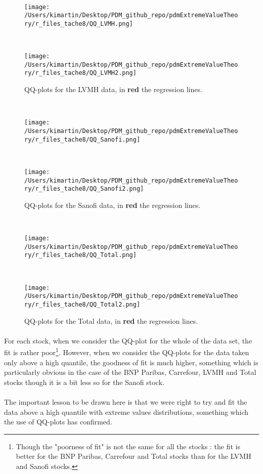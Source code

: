 \\
\begin{figure}[h!]
	\centering
	\begin{minipage}[b]{0.4\textwidth}
		\centering
		\texttt{[image: /Users/kimartin/Desktop/PDM\_github\_repo/pdmExtremeValueTheory/r\_files\_tache8/QQ\_LVMH.png]}
		\label{fig:QQLVMH1}
	\end{minipage}
	~
	\begin{minipage}[b]{0.4\textwidth}
		\centering
		\texttt{[image: /Users/kimartin/Desktop/PDM\_github\_repo/pdmExtremeValueTheory/r\_files\_tache8/QQ\_LVMH2.png]}
		\label{fig:QQLVMH2}
	\end{minipage}
	\caption{QQ-plots for the LVMH data, in \textbf{red} the regression lines.}
\end{figure}
\\
\begin{figure}[h!]
	\centering
	\begin{minipage}[b]{0.4\textwidth}
		\centering
		\texttt{[image: /Users/kimartin/Desktop/PDM\_github\_repo/pdmExtremeValueTheory/r\_files\_tache8/QQ\_Sanofi.png]}
		\label{fig:QQSanofi1}
	\end{minipage}
	~
	\begin{minipage}[b]{0.4\textwidth}
		\centering
		\texttt{[image: /Users/kimartin/Desktop/PDM\_github\_repo/pdmExtremeValueTheory/r\_files\_tache8/QQ\_Sanofi2.png]}
		\label{fig:QQSanofi2}
	\end{minipage}
	\caption{QQ-plots for the Sanofi data, in \textbf{red} the regression lines.}
\end{figure}
\\
\begin{figure}[h!]
	\centering
	\begin{minipage}[b]{0.4\textwidth}
		\centering
		\texttt{[image: /Users/kimartin/Desktop/PDM\_github\_repo/pdmExtremeValueTheory/r\_files\_tache8/QQ\_Total.png]}
		\label{fig:QQTotal1}
	\end{minipage}
	~
	\begin{minipage}[b]{0.4\textwidth}
		\centering
		\texttt{[image: /Users/kimartin/Desktop/PDM\_github\_repo/pdmExtremeValueTheory/r\_files\_tache8/QQ\_Total2.png]}
		\label{fig:QQTotal2}
	\end{minipage}
	\caption{QQ-plots for the Total data, in \textbf{red} the regression lines.}
\end{figure}
\clearpage
\paragraph{}
For each stock, when we consider the QQ-plot for the whole of the data set, the fit is rather poor\footnote{Though the "poorness of fit" is not the same for all the stocks : the fit is better for the BNP Paribas, Carrefour and Total stocks than for the LVMH and Sanofi stocks.}. However, when we consider the QQ-plots for the data taken only above a high quantile, the goodness of fit is much higher, something which is particularly obvious in the case of the BNP Paribas, Carrefour, LVMH and Total stocks though it is a bit less so for the Sanofi stock.
\paragraph{}
The important lesson to be drawn here is that we were right to try and fit the data above a high quantile with extreme values distributions, something which the use of QQ-plots has confirmed.